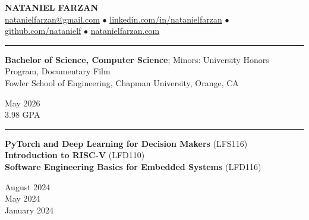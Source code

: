 \documentclass[letter]{article}
\begin{document}
    \begin{center}
        {\huge \textbf{\uppercase{Nataniel Farzan}}} \\
        \href{mailto:natanielfarzan@gmail.com}{natanielfarzan@gmail.com} $\bullet$
        \href{https://www.linkedin.com/in/natanielfarzan}{linkedin.com/in/natanielfarzan} $\bullet$
        \href{https://github.com/natanielf}{github.com/natanielf} $\bullet$
        \href{https://natanielfarzan.com/}{natanielfarzan.com}
    \end{center}

    \vspace{4pt}
    \hrule height 1pt
    \vspace{4pt}
    \noindent
    \begin{minipage}[c]{0.89\linewidth}
        \noindent \textbf{Bachelor of Science, Computer Science}; Minors: University Honors Program, Documentary Film \\
        \noindent Fowler School of Engineering, Chapman University, Orange, CA \\
    \end{minipage}
    \begin{minipage}[c]{0.10\linewidth}
        \vspace*{-\baselineskip}
        \begin{flushright}
            May 2026 \\
            3.98 GPA \\
        \end{flushright}
    \end{minipage}

    \vspace{4pt}
    \hrule height 1pt
    \vspace{4pt}
    \noindent
    \begin{minipage}[c]{0.7\linewidth}
        \noindent \textbf{PyTorch and Deep Learning for Decision Makers} (LFS116) \\
        \noindent \textbf{Introduction to RISC-V} (LFD110) \\
        \noindent \textbf{Software Engineering Basics for Embedded Systems} (LFD116) \\
    \end{minipage}
    \begin{minipage}[c]{0.29\linewidth}
        \vspace*{-\baselineskip}
        \begin{flushright}
            August 2024 \\
            May 2024 \\
            January 2024 \\
        \end{flushright}
    \end{minipage}
\end{document}
